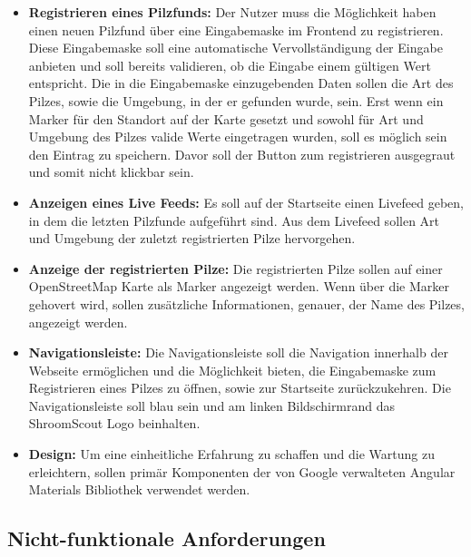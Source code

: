 \documentclass[../main.tex]{subfiles}
\begin{document}
\begin{itemize}

	\item \textbf{Registrieren eines Pilzfunds:}
	      Der Nutzer muss die Möglichkeit haben einen neuen Pilzfund über eine Eingabemaske im Frontend zu registrieren. Diese Eingabemaske soll eine
	      automatische Vervollständigung der Eingabe anbieten und soll bereits validieren, ob die Eingabe einem gültigen Wert entspricht. Die in die
	      Eingabemaske einzugebenden Daten sollen die Art des Pilzes, sowie die Umgebung, in der er gefunden wurde, sein. Erst wenn ein Marker für den
	      Standort auf der Karte gesetzt und sowohl für Art und Umgebung des Pilzes valide Werte eingetragen wurden, soll es möglich sein den Eintrag zu
	      speichern. Davor soll der Button zum registrieren ausgegraut und somit nicht klickbar sein.

	\item \textbf{Anzeigen eines Live Feeds:}
	      Es soll auf der Startseite einen Livefeed geben, in dem die letzten Pilzfunde aufgeführt sind. Aus dem Livefeed sollen Art und Umgebung der
	      zuletzt registrierten Pilze hervorgehen.

	\item \textbf{Anzeige der registrierten Pilze:}
	      Die registrierten Pilze sollen auf einer OpenStreetMap Karte als Marker angezeigt werden. Wenn über die Marker gehovert wird, sollen zusätzliche
	      Informationen, genauer, der Name des Pilzes, angezeigt werden.

	\item \textbf{Navigationsleiste:}
	      Die Navigationsleiste soll die Navigation innerhalb der Webseite ermöglichen und die Möglichkeit bieten, die Eingabemaske zum Registrieren eines
	      Pilzes zu öffnen, sowie zur Startseite zurückzukehren. Die Navigationsleiste soll blau sein und am linken Bildschirmrand das ShroomScout Logo
	      beinhalten.

	\item \textbf{Design:}
	      Um eine einheitliche Erfahrung zu schaffen und die Wartung zu erleichtern, sollen primär Komponenten der von Google verwalteten Angular Materials
	      Bibliothek verwendet werden.

\end{itemize}

\subsection{Nicht-funktionale Anforderungen}
\end{document}
